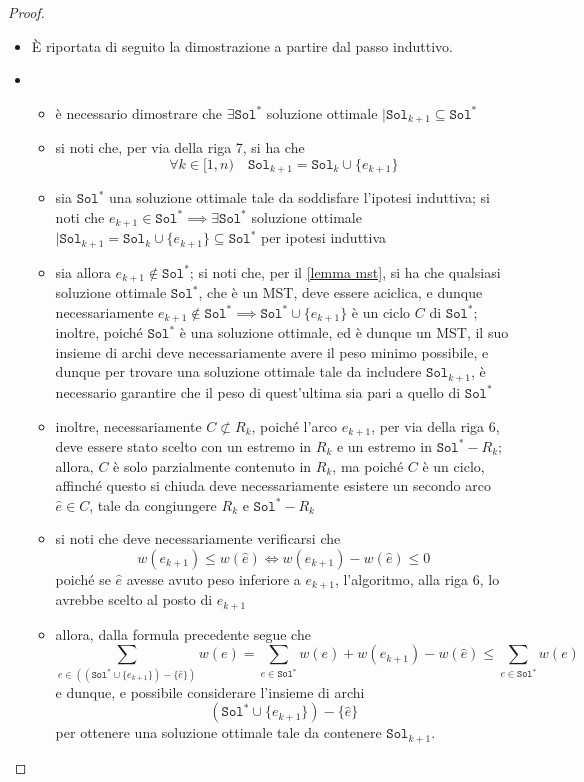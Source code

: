 \documentclass[a4paper, 12pt]{report}
\begin{document}
\begin{proof}
        \begin{itemize}
            \item[]  È riportata di seguito la dimostrazione a partire dal passo induttivo. 
            \item {}
                \begin{itemize}
                    \item è necessario dimostrare che $\exists \texttt{Sol}^*$ soluzione ottimale $\mid \texttt{Sol}_{k + 1} \subseteq \texttt{Sol}^*$
                    \item si noti che, per via della riga 7, si ha che $$\forall k \in [1, n) \quad \texttt{Sol}_{k +1} = \texttt{Sol}_k \cup \{e_{k +1}\}$$
                    \item sia $\texttt{Sol}^*$ una soluzione ottimale tale da soddisfare l'ipotesi induttiva; si noti che $e_{k +1} \in \texttt{Sol}^* \implies \exists \texttt{Sol}^*$ soluzione ottimale $\mid \texttt{Sol}_{k +1} = \texttt{Sol}_k \cup \{e_{k +1}\} \subseteq \texttt{Sol}^*$ per ipotesi induttiva
                    \item sia allora $e_{k +1} \notin \texttt{Sol}^*$; si noti che, per il \cref{lemma mst}, si ha che qualsiasi soluzione ottimale $\texttt{Sol}^*$, che è un MST, deve essere aciclica, e dunque necessariamente $e_{k +1} \notin \texttt{Sol}^* \implies \texttt{Sol}^* \cup \{e_{k +1}\}$ è un ciclo $C$ di $\texttt{Sol}^*$; inoltre, poiché $\texttt{Sol}^*$ è una soluzione ottimale, ed è dunque un MST, il suo insieme di archi deve necessariamente avere il peso minimo possibile, e dunque per trovare una soluzione ottimale tale da includere $\texttt{Sol}_{k + 1}$, è necessario garantire che il peso di quest'ultima sia pari a quello di $\texttt{Sol}^*$
                    \item inoltre, necessariamente $C \not \subset R_k$, poiché l'arco $e_{k + 1}$, per via della riga 6, deve essere stato scelto con un estremo in $R_k$ e un estremo in $\texttt{Sol}^* - R_k$; allora, $C$ è solo parzialmente contenuto in $R_k$, ma poiché $C$ è un ciclo, affinché questo si chiuda deve necessariamente esistere un secondo arco $\hat e \in C$, tale da congiungere $R_k$ e $\texttt{Sol}^* - R_k$
                    \item si noti che deve necessariamente verificarsi che $$w(e_{k +1}) \le w(\hat e) \iff w(e_{k +1}) - w(\hat e) \le 0$$ poiché se $\hat e$ avesse avuto peso inferiore a $e_{k +1}$, l'algoritmo, alla riga 6, lo avrebbe scelto al posto di $e_{k +1}$
                    \item allora, dalla formula precedente segue che $$\displaystyle \sum_{e \in ((\texttt{Sol}^* \cup \{e_{k +1}\} )- \{\hat e\} )}{w(e)}  = \sum_{e \in \texttt{Sol}^*}{w(e)} + w(e_{k +1}) - w(\hat e) \le \sum_{e \in \texttt{Sol}^*}{w(e)}$$ e dunque, e possibile considerare l'insieme di archi $$(\texttt{Sol}^* \cup \{e_{k+1}\}) - \{\hat e\}$$ per ottenere una soluzione ottimale tale da contenere $\texttt{Sol}_{k + 1}$.
                \end{itemize}


\end{itemize}
\end{proof}
\end{document}
